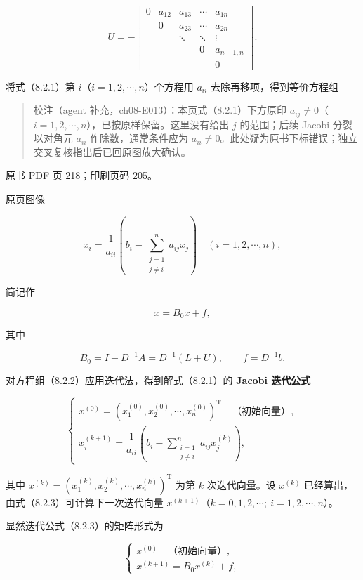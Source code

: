 \[
U=-\begin{bmatrix}
0&a_{12}&a_{13}&\cdots&a_{1n}\\
&0&a_{23}&\cdots&a_{2n}\\
&&\ddots&\ddots&\vdots\\
&&&0&a_{n-1,n}\\
&&&&0
\end{bmatrix}.
\]

将式（8.2.1）第 \(i\)（\(i=1,2,\cdots,n\)）个方程用 \(a_{ii}\) 去除再移项，得到等价方程组

\begin{quote}
校注（agent 补充，ch08-E013）：本页式（8.2.1）下方原印 \(a_{ij}\neq0\)（\(i=1,2,\cdots,n\)），已按原样保留。这里没有给出 \(j\) 的范围；后续 Jacobi 分裂以对角元 \(a_{ii}\) 作除数，通常条件应为 \(a_{ii}\neq0\)。此处疑为原书下标错误；独立交叉复核指出后已回原图放大确认。
\end{quote}

\clearpage

原书 PDF 页 218；印刷页码 205。

\href{source-images/pdf-218.jpeg}{原页图像}

\[
x_i=\frac1{a_{ii}}\left(b_i-\sum_{\substack{j=1\\j\neq i}}^n a_{ij}x_j\right)\quad(i=1,2,\cdots,n),
\tag{8.2.2}
\]

简记作

\[
x=B_0x+f,
\]

其中

\[
B_0=I-D^{-1}A=D^{-1}(L+U),\qquad f=D^{-1}b.
\]

对方程组（8.2.2）应用迭代法，得到解式（8.2.1）的 \textbf{Jacobi 迭代公式}

\[
\begin{cases}
x^{(0)}=(x_1^{(0)},x_2^{(0)},\cdots,x_n^{(0)})^{\mathrm T}\quad\text{（初始向量）},\\[4pt]
x_i^{(k+1)}=\dfrac1{a_{ii}}\left(b_i-\displaystyle\sum_{\substack{i=1\\j\neq i}}^n a_{ij}x_j^{(k)}\right),
\end{cases}
\tag{8.2.3}
\]

其中 \(x^{(k)}=(x_1^{(k)},x_2^{(k)},\cdots,x_n^{(k)})^{\mathrm T}\) 为第 \(k\) 次迭代向量。设 \(x^{(k)}\) 已经算出，由式（8.2.3）可计算下一次迭代向量 \(x^{(k+1)}\)（\(k=0,\allowbreak 1,\allowbreak 2,\allowbreak \cdots;\ i=1,\allowbreak 2,\allowbreak \cdots,\allowbreak n\)）。

显然迭代公式（8.2.3）的矩阵形式为

\[
\begin{cases}
x^{(0)}\quad\text{（初始向量）},\\
x^{(k+1)}=B_0x^{(k)}+f,
\end{cases}
\tag{8.2.4}
\]

